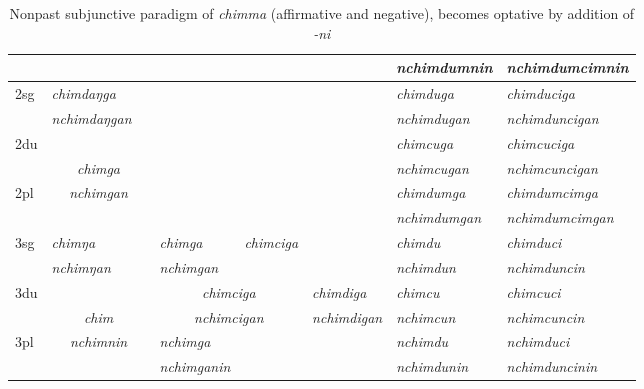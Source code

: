 \begin{landscape}
\begin{table}
{{\begin{tabular}{|l||p{2.4cm}|p{2.0cm}|p{2.6cm}|p{2.6cm}|p{2.6cm}|p{3.2cm}|p{3.2cm}|}
		&  \multicolumn{2}{c|}{\cellcolor[gray]{.8} }& \multicolumn{3}{c|}{\cellcolor[gray]{.8} }& \it nchimdumnin & \it  nchimdumcimnin\\
\hline				
{\sc 2sg }		& \it 	chimdaŋga  & \it 	    &\multicolumn{3}{c|}{ \cellcolor[gray]{.8}}& \it  chimduga & \it    chimduciga\\
		& \it   nchimdaŋgan & \it   & \multicolumn{3}{c|}{\cellcolor[gray]{.8} }& \it  nchimdugan & \it nchimduncigan  \\
 \cline{1-2} \cline{7-8}			
{\sc 2du}		&	\multicolumn{2}{c|}{}     &  \multicolumn{3}{c|}{\cellcolor[gray]{.8}} & \it  chimcuga  & \it   chimcuciga \\
		& 	\multicolumn{2}{c|}{\it chimga} & \multicolumn{3}{c|}{\cellcolor[gray]{.8} }& \it nchimcugan  & \it  nchimcuncigan \\
 \cline{1-1} \cline{7-8}			
{\sc 2pl}		& 	\multicolumn{2}{c|}{\it nchimgan} &  \multicolumn{3}{c|}{ \cellcolor[gray]{.8}}& \it  chimdumga& \it  chimdumcimga  \\
		& 	\multicolumn{2}{c|}{ }& \multicolumn{3}{c|}{\cellcolor[gray]{.8} }& \it  nchimdumgan & \it  nchimdumcimgan \\
\hline			
{\sc 3sg} 		& \it chimŋa	  & \it 	      	& \it   chimga	 	& \it   chimciga	  & \it     	& \it chimdu& \it chimduci\\
		& \it  nchimŋan   & \it    	& \it nchimgan& \it  & \it    								& \it nchimdun& \it nchimduncin\\
  \cline{1-2}  \cline{4-4} \cline{7-8}					
{\sc 3du}& \multicolumn{2}{c|}{}& \multicolumn{2}{c|}{\it chimciga}& \it chimdiga& \it   chimcu & \it   chimcuci\\
	&  \multicolumn{2}{c|}{\it chim}			&   \multicolumn{2}{c|}{\it nchimcigan} & \it  nchimdigan & \it  nchimcun & \it  nchimcuncin\\
 \cline{1-1} \cline{4-4} \cline{7-8}	
{\sc 3pl} & \multicolumn{2}{c|}{\it nchimnin}	& \it nchimga& \it  & \it  & \it nchimdu& \it nchimduci\\	
	& \multicolumn{2}{c|}{ }				& \it nchimganin& \it & \it  						& \it nchimdunin& \it nchimduncinin \\
\hline
\end{tabular}
}
}
\caption{Nonpast subjunctive paradigm of \emph{chimma}  (affirmative and negative), becomes optative by addition of \emph{-ni}}\label{par-chimd-sbjv}
\end{table}
\end{landscape}
 
 
